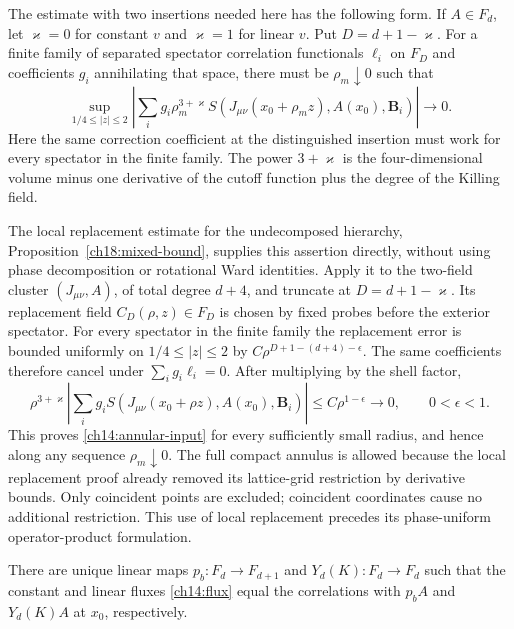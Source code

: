 

The estimate with two insertions needed here has the following form.
If $A\in F_d$, let $\varkappa=0$ for constant $v$ and
$\varkappa=1$ for linear $v$. Put $D=d+1-\varkappa$.
For a finite family of separated spectator correlation functionals $\ell_i$ on
$F_D$ and coefficients $g_i$ annihilating that space,
there must be $\rho_m\downarrow0$ such that
\begin{equation}\label{ch14:annular-input}
 \sup_{1/4\le|z|\le2}
 \left|\sum_i g_i\rho_m^{3+\varkappa}
       S(J_{\mu\nu}(x_0+\rho_m z),A(x_0),\boldsymbol B_i)\right|
                  \longrightarrow0.
\end{equation}
Here the same correction coefficient at the distinguished insertion
must work for every spectator in the finite family.
The power $3+\varkappa$ is the four-dimensional volume minus one
derivative of the cutoff function plus the degree of the Killing field.

The local replacement estimate for the undecomposed hierarchy,
Proposition~\ref{ch18:mixed-bound}, supplies this assertion directly,
without using phase decomposition or rotational Ward identities.
Apply it to the two-field cluster $(J_{\mu\nu},A)$, of total degree
$d+4$, and truncate at $D=d+1-\varkappa$. Its replacement field
$C_D(\rho,z)\in F_D$ is chosen by fixed probes before the exterior
spectator. For every spectator in the finite family the replacement error is
bounded uniformly on $1/4\le|z|\le2$ by
$C\rho^{D+1-(d+4)-\epsilon}$. The same coefficients therefore cancel
under $\sum_i g_i\ell_i=0$. After multiplying by the shell factor,
\[
 \rho^{3+\varkappa}
 \left|\sum_i g_iS(J_{\mu\nu}(x_0+\rho z),A(x_0),\boldsymbol B_i)\right|
 \le C\rho^{1-\epsilon}\longrightarrow0,
 \qquad 0<\epsilon<1.
\]
This proves \eqref{ch14:annular-input} for every sufficiently small
radius, and hence along any sequence $\rho_m\downarrow0$.
The full compact annulus is allowed because the local replacement
proof already removed its lattice-grid restriction by derivative
bounds. Only coincident points are excluded; coincident coordinates cause
no additional restriction. This use of local replacement precedes
its phase-uniform operator-product formulation.

\begin{proposition}
\label{ch14:charges}
There are unique linear maps
$p_b:F_d\to F_{d+1}$ and
$Y_d(K):F_d\to F_d$ such that the constant and
linear fluxes \eqref{ch14:flux} equal the correlations with
$p_bA$ and $Y_d(K)A$ at $x_0$, respectively.
\end{proposition}

